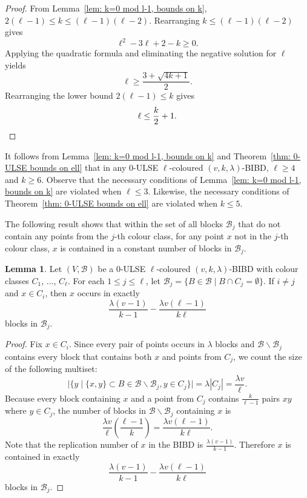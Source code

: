 \documentclass[12pt]{article}
\theoremstyle{definition}
\newtheorem{lemma}[theorem]{Lemma}
\begin{document}
\begin{proof}
    From Lemma~\ref{lem: k=0 mod l-1, bounds on k}, $2(\ell-1) \leq k \leq (\ell-1)(\ell-2)$. Rearranging $k\leq (\ell-1)(\ell-2)$ gives \[\ell^2 -3\ell +2 - k \geq 0.\] Applying the quadratic formula and eliminating the negative solution for $\ell$ yields \[\ell \geq \frac{3 + \sqrt{4k+1}}{2}.\] Rearranging the lower bound $2(\ell-1)\leq k$ gives \[\ell \leq \frac{k}{2} + 1. \qedhere\] 
\end{proof}

It follows from Lemma~\ref{lem: k=0 mod l-1, bounds on k} and Theorem~\ref{thm: 0-ULSE bounds on ell} that in any $0$-ULSE $\ell$-coloured $(v,k,\lambda)$-BIBD, $\ell \geq 4$ and $k\geq 6$. Observe that the necessary conditions of Lemma~\ref{lem: k=0 mod l-1, bounds on k} are violated when $\ell \leq 3$. Likewise, the necessary conditions of Theorem~\ref{thm: 0-ULSE bounds on ell} are violated when $k\leq 5$.

The following result shows that within the set of all blocks $\mathcal{B}_j$ that do not contain any points from the $j$-th colour class, for any point $x$ not in the $j$-th colour class, $x$ is contained in a constant number of blocks in $\mathcal{B}_j$.

\begin{lemma}\label{lem: points in colour class are 'evenly' distributed}
    Let $(V,\mathcal{B})$ be a $0$-ULSE $\ell$-coloured $(v,k,\lambda)$-BIBD with colour classes $C_1$, $\dots$, $C_\ell$. For each $1\leq j\leq \ell$, let $\mathcal{B}_j = \{B\in \mathcal{B} \mid B\cap C_j = \emptyset\}$. If $i\neq j$ and $x\in C_i$, then $x$ occurs in exactly \[\frac{\lambda(v-1)}{k-1} - \frac{\lambda v(\ell-1)}{k\ell}\] blocks in $\mathcal{B}_j$. 
\end{lemma}

\begin{proof}
    Fix $x\in C_i$. Since every pair of points occurs in $\lambda$ blocks and $\mathcal{B}\backslash\mathcal{B}_j$ contains every block that contains both $x$ and points from $C_j$, we count the size of the following multiset: \[\big|\big\{y \mid \{x,y\}\subset B \in \mathcal{B}\backslash\mathcal{B}_j, y\in C_j \big\}\big| = \lambda|C_j| = \frac{\lambda v}{\ell}.\] Because every block containing $x$ and a point from $C_j$ contains $\frac{k}{\ell-1}$ pairs $xy$ where $y\in C_j$, the number of blocks in $\mathcal{B}\backslash\mathcal{B}_j$ containing $x$ is \[\frac{\lambda v}{\ell} \left( \frac{\ell-1}{k} \right) = \frac{\lambda v (\ell-1)}{k\ell}.\] Note that the replication number of $x$ in the BIBD is $\frac{\lambda(v-1)}{k-1}$. Therefore $x$ is contained in exactly \[\frac{\lambda(v-1)}{k-1} - \frac{\lambda v(\ell-1)}{k\ell}\] blocks in $\mathcal{B}_j$. 
\end{proof}
\end{document}
